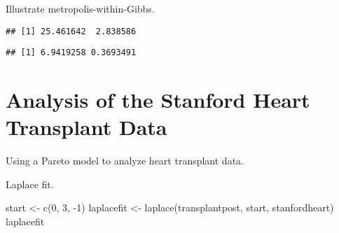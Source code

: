 \documentclass[
]{book}
\newenvironment{Shaded}{\begin{snugshade}}{\end{snugshade}}
\newcommand{\DecValTok}[1]{\textcolor[rgb]{0.00,0.00,0.81}{#1}}
\newcommand{\FunctionTok}[1]{\textcolor[rgb]{0.00,0.00,0.00}{#1}}
\newcommand{\NormalTok}[1]{#1}
\newcommand{\OtherTok}[1]{\textcolor[rgb]{0.56,0.35,0.01}{#1}}
\newcommand{\SpecialCharTok}[1]{\textcolor[rgb]{0.00,0.00,0.00}{#1}}
\begin{document}
Illustrate metropolis-within-Gibbs.

\begin{Shaded}
\end{Shaded}

\begin{Shaded}
\end{Shaded}

\begin{verbatim}
## [1] 25.461642  2.838586
\end{verbatim}

\begin{Shaded}
\end{Shaded}

\begin{verbatim}
## [1] 6.9419258 0.3693491
\end{verbatim}

\hypertarget{analysis-of-the-stanford-heart-transplant-data}{%
\section{Analysis of the Stanford Heart Transplant Data}\label{analysis-of-the-stanford-heart-transplant-data}}

Using a Pareto model to analyze heart transplant data.

Laplace fit.

\begin{Shaded}
\begin{Highlighting}[]
\NormalTok{start }\OtherTok{\textless{}{-}} \FunctionTok{c}\NormalTok{(}\DecValTok{0}\NormalTok{, }\DecValTok{3}\NormalTok{, }\SpecialCharTok{{-}}\DecValTok{1}\NormalTok{)}
\NormalTok{laplacefit }\OtherTok{\textless{}{-}} \FunctionTok{laplace}\NormalTok{(transplantpost, }
\NormalTok{                      start, stanfordheart)}
\NormalTok{laplacefit}
\end{Highlighting}
\end{Shaded}
\end{document}
